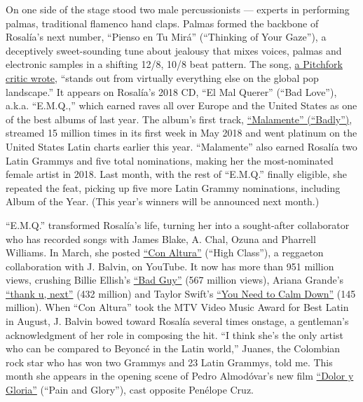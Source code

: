On one side of the stage stood two male percussionists --- experts in
performing palmas, traditional flamenco hand claps. Palmas formed the
backbone of Rosalía's next number, ``Pienso en Tu Mirá'' (``Thinking of
Your Gaze''), a deceptively sweet-sounding tune about jealousy that
mixes voices, palmas and electronic samples in a shifting 12/8, 10/8
beat pattern. The song,
\href{https://pitchfork.com/features/rising/get-to-know-rosalia-the-spanish-singer-giving-flamencos-age-old-sound-a-bracingly-modern-twist/}{a
Pitchfork critic wrote}, ``stands out from virtually everything else on
the global pop landscape.'' It appears on Rosalía's 2018 CD, ``El Mal
Querer'' (``Bad Love''), a.k.a. ``E.M.Q.,'' which earned raves all over
Europe and the United States as one of the best albums of last year. The
album's first track,
\href{https://www.nytimes3xbfgragh.onion/interactive/2019/03/07/magazine/top-songs.html\#/rosala}{``Malamente''
(``Badly'')}, streamed 15 million times in its first week in May 2018
and went platinum on the United States Latin charts earlier this year.
``Malamente'' also earned Rosalía two Latin Grammys and five total
nominations, making her the most-nominated female artist in 2018. Last
month, with the rest of ``E.M.Q.'' finally eligible, she repeated the
feat, picking up five more Latin Grammy nominations, including Album of
the Year. (This year's winners will be announced next month.)

``E.M.Q.'' transformed Rosalía's life, turning her into a sought-after
collaborator who has recorded songs with James Blake, A. Chal, Ozuna and
Pharrell Williams. In March, she posted
\href{https://www.youtube.com/watch?v=p7bfOZek9t4}{``Con Altura''}
(``High Class''), a reggaeton collaboration with J. Balvin, on YouTube.
It now has more than 951 million views, crushing Billie Ellish's
\href{https://www.youtube.com/watch?v=DyDfgMOUjCI}{``Bad Guy''} (567
million views), Ariana Grande's
\href{https://www.youtube.com/watch?v=gl1aHhXnN1k}{``thank u, next''}
(432 million) and Taylor Swift's
\href{https://www.youtube.com/watch?v=Dkk9gvTmCXY}{``You Need to Calm
Down''} (145 million). When ``Con Altura'' took the MTV Video Music
Award for Best Latin in August, J. Balvin bowed toward Rosalía several
times onstage, a gentleman's acknowledgment of her role in composing the
hit. ``I think she's the only artist who can be compared to Beyoncé in
the Latin world,'' Juanes, the Colombian rock star who has won two
Grammys and 23 Latin Grammys, told me. This month she appears in the
opening scene of Pedro Almodóvar's new film
\href{https://www.nytimes3xbfgragh.onion/2019/10/03/movies/pain-and-glory-review.html}{``Dolor
y Gloria''} (``Pain and Glory''), cast opposite Penélope Cruz.

